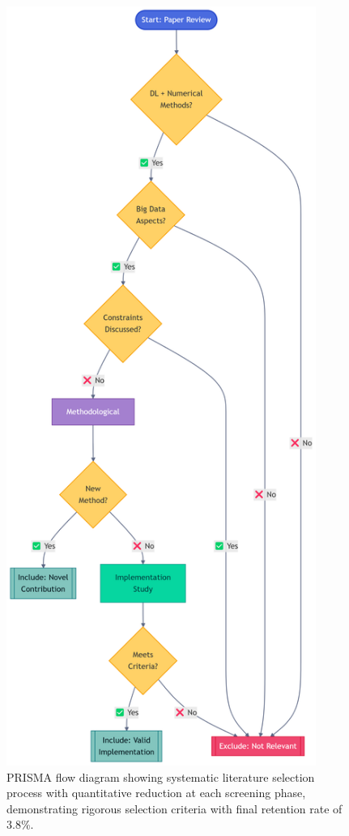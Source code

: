 \documentclass[acmsmall]{acmart}
\begin{document}
\begin{figure}[H]
    \centering
    \includegraphics[width=0.9\textwidth]{media/prisma1.png}
    \caption{PRISMA flow diagram showing systematic literature selection process with quantitative reduction at each screening phase, demonstrating rigorous selection criteria with final retention rate of 3.8\%.}
    \label{fig:study_selection_flow}
\end{figure}
\end{document}
